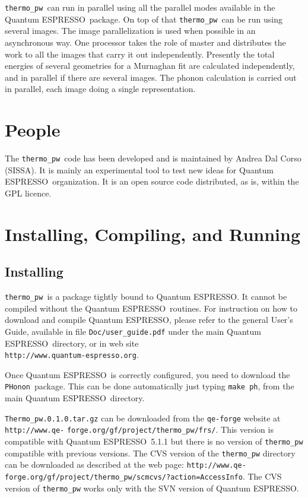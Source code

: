\documentclass[12pt,a4paper]{article}
\def\qe{{\sc Quantum ESPRESSO}}
\def\PHonon{\texttt{PHonon}}
\def\thermo{\texttt{thermo\_pw}}
\begin{document}
\thermo\ can run in parallel using all the parallel modes available in
the \qe\ package. On top of that \thermo\ can be run using several images.
The image parallelization is used when possible in an asynchronous way.
One processor takes the role of master and distributes the work 
to all the images that carry it out independently. Presently 
the total energies of several geometries for a Murnaghan fit are
calculated independently, and in parallel if there are several images.  
The phonon calculation is carried out in parallel, each image doing 
a single representation.

\section{People}
The \thermo\ code has been developed and is maintained by Andrea Dal Corso 
(SISSA). It is mainly an experimental tool to test new ideas for \qe\ 
organization. It is an open source code distributed, as is, within the GPL 
licence.  

\section{Installing, Compiling, and Running}

\subsection{Installing}

\thermo\ is a package tightly bound to \qe. It cannot be compiled without
the \qe\ routines. For instruction on how to download and compile \qe, please 
refer to the general User's Guide, available in file \texttt{Doc/user\_guide.pdf}
under the main \qe\ directory, or in web site \\
\texttt{http://www.quantum-espresso.org}.

Once \qe\ is correctly configured, you need to download the \PHonon\ 
package. This can be done automatically just typing \texttt{make ph}, from 
the main \qe\ directory.

\texttt{Thermo\_pw.0.1.0.tar.gz} can be downloaded from the 
\texttt{qe-forge} website at \texttt{http://www.qe-} \texttt{forge.org/gf/project/thermo\_pw/frs/}. This version is compatible with \qe\ 5.1.1
but there is no version of \texttt{thermo\_pw} compatible with previous
versions.
The CVS version of the \texttt{thermo\_pw} directory can be downloaded as 
described at
the web page: \texttt{http://www.qe-} \texttt{forge.org/gf/project/thermo\_pw/scmcvs/?action=AccessInfo}.
The CVS version of \texttt{thermo\_pw} works only with the SVN version of \qe. 
\end{document}
